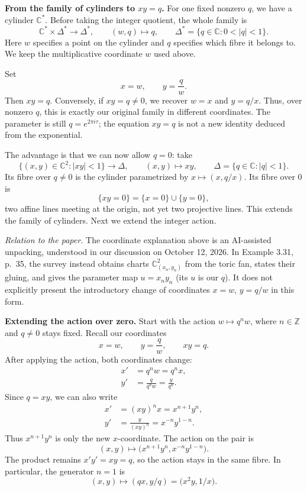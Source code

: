 \medskip\noindent
{\bf From the family of cylinders to $xy=q$.}
For one fixed nonzero $q$, we have a
cylinder $\mathbb{C}^*$. Before taking
the integer quotient, the whole family is
$$
\mathbb{C}^*\times\Delta^*\longrightarrow\Delta^*,
\qquad (w,q)\longmapsto q,
\qquad \Delta^*=\{q\in\mathbb{C}:0<|q|<1\}.
$$
Here $w$ specifies a point on the cylinder
and $q$ specifies which fibre it belongs to.
We keep the multiplicative coordinate $w$
used above.

Set
$$
x=w,\qquad y=\frac{q}{w}.
$$
Then $xy=q$. Conversely, if $xy=q\ne0$,
we recover $w=x$ and $y=q/x$.
Thus, over nonzero $q$, this is exactly
our original family in different coordinates.
The parameter is still $q=e^{2\pi i\tau}$;
the equation $xy=q$ is not a new identity
deduced from the exponential.

The advantage is that we can now allow
$q=0$: take
$$
\{(x,y)\in\mathbb{C}^2:|xy|<1\}
\longrightarrow\Delta,\qquad (x,y)\longmapsto xy,
\qquad \Delta=\{q\in\mathbb{C}:|q|<1\}.
$$
Its fibre over $q\ne0$ is the cylinder
parametrized by $x\mapsto(x,q/x)$.
Its fibre over $0$ is
$$
\{xy=0\}=\{x=0\}\cup\{y=0\},
$$
two affine lines meeting at the origin,
not yet two projective lines.
This extends the family of cylinders.
Next we extend the integer action.

\medskip\noindent
{\it Relation to the paper.}
The coordinate explanation above is an
AI-assisted unpacking, understood in our
discussion on October 12, 2026.
In Example 3.31, p.~35, the survey instead
obtains charts $\mathbb{C}^2_{(x_n,y_n)}$
from the toric fan, states their gluing,
and gives the parameter map $u=x_ny_n$
(its $u$ is our $q$). It does not explicitly
present the introductory change of
coordinates $x=w$, $y=q/w$ in this form.

\medskip\noindent
{\bf Extending the action over zero.}
Start with the action $w\mapsto q^nw$,
where $n\in\mathbb{Z}$ and $q\ne0$
stays fixed. Recall our coordinates
$$
x=w,\qquad y=\frac{q}{w},\qquad xy=q.
$$
After applying the action, both
coordinates change:
$$
\begin{aligned}
x'&=q^nw=q^nx,\\
y'&=\frac{q}{q^nw}=\frac{y}{q^n}.
\end{aligned}
$$
Since $q=xy$, we can also write
$$
\begin{aligned}
x'&=(xy)^nx=x^{n+1}y^n,\\
y'&=\frac{y}{(xy)^n}=x^{-n}y^{1-n}.
\end{aligned}
$$
Thus $x^{n+1}y^n$ is only the new
$x$-coordinate. The action on the pair is
$$
(x,y)\longmapsto
\bigl(x^{n+1}y^n,x^{-n}y^{1-n}\bigr).
$$
The product remains $x'y'=xy=q$, so
the action stays in the same fibre.
In particular, the generator $n=1$ is
$$
(x,y)\longmapsto(qx,y/q)
=\bigl(x^2y,1/x\bigr).
$$

